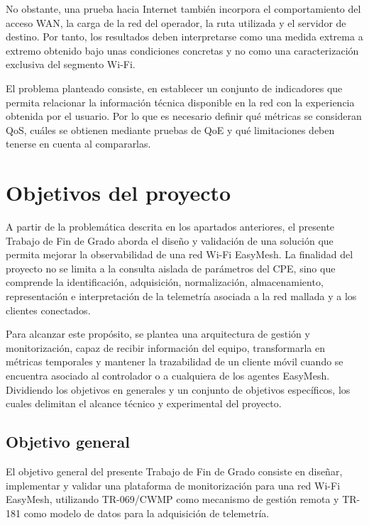 No obstante, una prueba hacia Internet también incorpora 
el comportamiento del acceso WAN, la carga de la red del operador, 
la ruta utilizada y el servidor de destino. Por tanto, 
los resultados deben interpretarse como una medida extrema a extremo 
obtenido bajo unas condiciones concretas y no como una 
caracterización exclusiva del segmento Wi-Fi.

El problema planteado consiste, 
en establecer un conjunto de indicadores que permita relacionar 
la información técnica disponible en la red con la experiencia 
obtenida por el usuario. 
Por lo que es necesario definir qué métricas se consideran QoS, 
cuáles se obtienen mediante pruebas de QoE y 
qué limitaciones deben tenerse en cuenta al compararlas.

\section{Objetivos del proyecto}
\label{sec:objetivos-proyecto}

A partir de la problemática descrita en los apartados anteriores, el
presente Trabajo de Fin de Grado aborda el diseño y validación de una
solución que permita mejorar la observabilidad de una red Wi-Fi EasyMesh.
La finalidad del proyecto no se limita a la consulta aislada de
parámetros del CPE, sino que comprende la identificación, adquisición,
normalización, almacenamiento, representación e interpretación de la
telemetría asociada a la red mallada y a los clientes conectados.

Para alcanzar este propósito, se plantea una arquitectura
de gestión y monitorización, capaz de recibir
información del equipo, transformarla en métricas temporales y mantener
la trazabilidad de un cliente móvil cuando se encuentra asociado al
controlador o a cualquiera de los agentes EasyMesh. 
Dividiendo los objetivos en generales y un conjunto de objetivos específicos, 
los cuales delimitan el alcance técnico y experimental del proyecto.

\subsection{Objetivo general}
\label{subsec:objetivo-general}

El objetivo general del presente Trabajo de Fin de Grado consiste en
diseñar, implementar y validar una plataforma de monitorización para una
red Wi-Fi EasyMesh, utilizando TR-069/CWMP como mecanismo de gestión remota 
y TR-181 como modelo de datos para la adquisición de telemetría.

